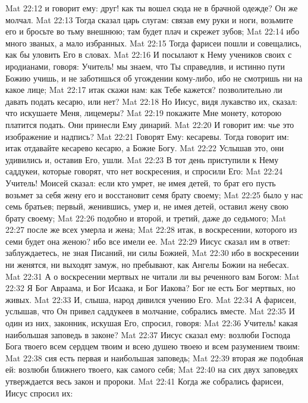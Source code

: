 \vs Mat 22:12 и говорит ему: друг! как ты вошел сюда не в брачной одежде? Он же молчал.
\vs Mat 22:13 Тогда сказал царь слугам: связав ему руки и ноги, возьмите его и бросьте во тьму внешнюю; там будет плач и скрежет зубов;
\vs Mat 22:14 ибо много званых, а мало избранных.
\rsbpar\vs Mat 22:15 Тогда фарисеи пошли и совещались, как бы уловить Его в словах.
\vs Mat 22:16 И посылают к Нему учеников своих с иродианами, говоря: Учитель! мы знаем, что Ты справедлив, и истинно пути Божию учишь, и не заботишься об угождении кому-либо, ибо не смотришь ни на какое лице;
\vs Mat 22:17 итак скажи нам: как Тебе кажется? позволительно ли давать подать кесарю, или нет?
\vs Mat 22:18 Но Иисус, видя лукавство их, сказал: что искушаете Меня, лицемеры?
\vs Mat 22:19 покажите Мне монету, которою платится подать. Они принесли Ему динарий.
\vs Mat 22:20 И говорит им: чье это изображение и надпись?
\vs Mat 22:21 Говорят Ему: кесаревы. Тогда говорит им: итак отдавайте кесарево кесарю, а Божие Богу.
\vs Mat 22:22 Услышав это, они удивились и, оставив Его, ушли.
\rsbpar\vs Mat 22:23 В тот день приступили к Нему саддукеи, которые говорят, что нет воскресения, и спросили Его:
\vs Mat 22:24 Учитель! Моисей сказал: если кто умрет, не имея детей, то брат его пусть возьмет за себя жену его и восстановит семя брату своему;
\vs Mat 22:25 было у нас семь братьев; первый, женившись, умер и, не имея детей, оставил жену свою брату своему;
\vs Mat 22:26 подобно и второй, и третий, даже до седьмого;
\vs Mat 22:27 после же всех умерла и жена;
\vs Mat 22:28 итак, в воскресении, которого из семи будет она женою? ибо все имели ее.
\vs Mat 22:29 Иисус сказал им в ответ: заблуждаетесь, не зная Писаний, ни силы Божией,
\vs Mat 22:30 ибо в воскресении ни женятся, ни выходят замуж, но пребывают, как Ангелы Божии на небесах.
\vs Mat 22:31 А о воскресении мертвых не читали ли вы реченного вам Богом:
\vs Mat 22:32 Я Бог Авраама, и Бог Исаака, и Бог Иакова? Бог не есть Бог мертвых, но живых.
\vs Mat 22:33 И, слыша, народ дивился учению Его.
\rsbpar\vs Mat 22:34 А фарисеи, услышав, что Он привел саддукеев в молчание, собрались вместе.
\vs Mat 22:35 И один из них, законник, искушая Его, спросил, говоря:
\vs Mat 22:36 Учитель! какая наибольшая заповедь в законе?
\vs Mat 22:37 Иисус сказал ему: возлюби Господа Бога твоего всем сердцем твоим и всею душею твоею и всем разумением твоим:
\vs Mat 22:38 сия есть первая и наибольшая заповедь;
\vs Mat 22:39 вторая же подобная ей: возлюби ближнего твоего, как самого себя;
\vs Mat 22:40 на сих двух заповедях утверждается весь закон и пророки.
\rsbpar\vs Mat 22:41 Когда же собрались фарисеи, Иисус спросил их:
